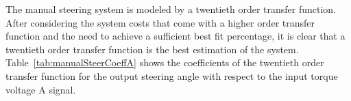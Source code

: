 \documentclass[journal,twoside,web]{ieeecolor}
\begin{document}
\vspace{12pt}
\noindent The manual steering system is modeled by a twentieth order transfer
function. After considering the system costs that come with a higher order
transfer function and the need to achieve a sufficient best fit percentage, it
is clear that a twentieth order transfer function is the best estimation of the
system. Table~\ref{tab:manualSteerCoeffA} shows the coefficients of the twentieth
order transfer function for the output steering angle with respect to the input
torque voltage A signal. %
%
  \begin{table}[hbtp]
    \caption{Manual mode steering transfer function torque voltage A coefficient table. }
    \label{tab:manualSteerCoeffA}
    \centering
    \begin{center}
    \end{center}
  \end{table}
%
\end{document}
